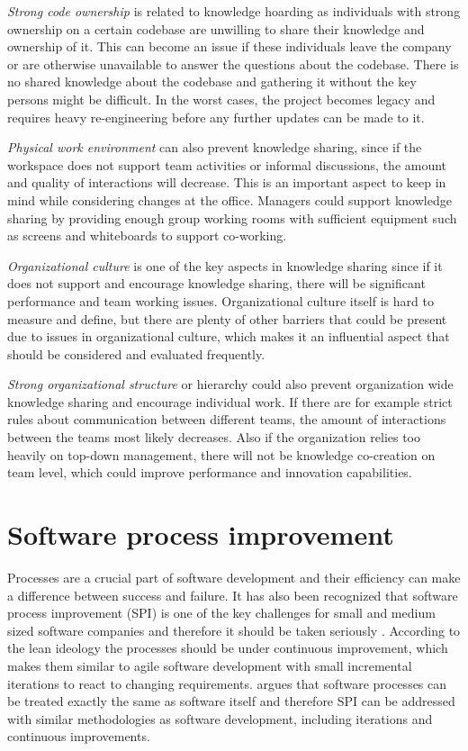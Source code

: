 \emph{Strong code ownership} is related to knowledge hoarding as individuals with strong ownership on a certain codebase are unwilling to share their knowledge and ownership
of it. This can become an issue if these individuals leave the company or are otherwise unavailable to answer the questions about the codebase. There is no shared knowledge about the
codebase and gathering it without the key persons might be difficult. In the worst cases, the project becomes legacy and requires heavy re-engineering before any
further updates can be made to it. \citep{Riege2005}

\emph{Physical work environment} can also prevent knowledge sharing, since if the workspace does not support team activities or informal discussions, the amount and quality
of interactions will decrease. This is an important aspect to keep in mind while considering changes at the office. Managers could support knowledge sharing by providing
enough group working rooms with sufficient equipment such as screens and whiteboards to support co-working. \citep{Riege2005}

\emph{Organizational culture} is one of the key aspects in knowledge sharing since if it does not support and encourage knowledge sharing, there will be significant performance
and team working issues. Organizational culture itself is hard to measure and define, but there are plenty of other barriers that could be present due to issues in
organizational culture, which makes it an influential aspect that should be considered and evaluated frequently. \citep{Riege2005}

\emph{Strong organizational structure} or hierarchy could also prevent organization wide knowledge sharing and encourage individual work. If there are for example
strict rules about communication between different teams, the amount of interactions between the teams most likely decreases.
Also if the organization relies too heavily on top-down management, there will not be knowledge co-creation on team level,
which could improve performance and innovation capabilities. \citep{Riege2005}

\section{Software process improvement}

Processes are a crucial part of software development and their efficiency can make a difference between success and failure. It has also been recognized that software process
improvement (SPI) is one of the key challenges for small and medium sized software companies and therefore it should be taken seriously \citep{Sulayman2009}.
According to the lean ideology the processes should be under continuous improvement, which makes them similar to agile software development with small incremental
iterations to react to changing requirements. \citet{Osterweil2011} argues that software processes can be treated exactly the same
as software itself and therefore SPI can be addressed with similar methodologies as software development, including iterations and continuous improvements.

